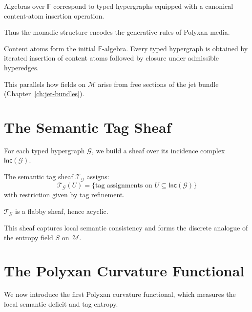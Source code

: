 \begin{proposition}
Algebras over $\mathbb{F}$ correspond to typed hypergraphs equipped with a
canonical content-atom insertion operation.
\end{proposition}

Thus the monadic structure encodes the generative rules of Polyxan media.

\begin{theorem}
Content atoms form the initial $\mathbb{F}$-algebra.  Every typed hypergraph is
obtained by iterated insertion of content atoms followed by closure under
admissible hyperedges.
\end{theorem}

This parallels how fields on $\mathcal{M}$ arise from free sections of the jet
bundle (Chapter~\ref{ch:jet-bundles}).

\section{The Semantic Tag Sheaf}

For each typed hypergraph $\mathcal{G}$, we build a sheaf over its incidence
complex $\mathsf{Inc}(\mathcal{G})$.

\begin{definition}
The semantic tag sheaf $\mathscr{T}_{\mathcal{G}}$ assigns:
\[
\mathscr{T}_{\mathcal{G}}(U)
=
\{\text{tag assignments on } U \subseteq \mathsf{Inc}(\mathcal{G})\}
\]
with restriction given by tag refinement.
\end{definition}

\begin{proposition}
$\mathscr{T}_{\mathcal{G}}$ is a flabby sheaf, hence acyclic.
\end{proposition}

This sheaf captures local semantic consistency and forms the discrete analogue
of the entropy field $S$ on $\mathcal{M}$.

\section{The Polyxan Curvature Functional}

We now introduce the first Polyxan curvature functional, which measures the
local semantic deficit and tag entropy.


